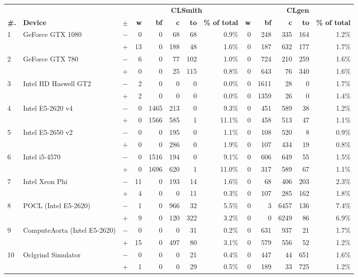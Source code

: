   \begin{tabular}{lll | rrrrr | rrrrr }
  \toprule
  & & & \multicolumn{5}{c|}{\textbf{CLSmith}} & \multicolumn{5}{c}{\textbf{CLgen}} \\
  \textbf{\#.} & \textbf{Device} & $\pm$ &
  \textbf{w} & \textbf{bf} & \textbf{c} & \textbf{to} & \textbf{\% of total} &
  \textbf{w} & \textbf{bf} & \textbf{c} & \textbf{to} & \textbf{\% of total} \\
  \midrule
  \multirow{ 2}{*}{1} & \multirow{ 2}{*}{GeForce GTX 1080} & $-$ & 0 & 0 & 68 & 68 & 0.9\%       & 0 & 248 & 335 & 164 & 1.2\% \\& & $+$ & 13 & 0 & 188 & 48 & 1.6\% & 0 & 187 & 632 & 177 & 1.7\% \\
\hline
\multirow{ 2}{*}{2} & \multirow{ 2}{*}{GeForce GTX 780} & $-$ & 6 & 0 & 77 & 102 & 1.0\%       & 0 & 724 & 210 & 259 & 1.6\% \\& & $+$ & 0 & 0 & 25 & 115 & 0.8\% & 0 & 643 & 76 & 340 & 1.6\% \\
\hline
\multirow{ 2}{*}{3} & \multirow{ 2}{*}{Intel HD Haswell GT2} & $-$ & 2 & 0 & 0 & 0 & 0.0\%       & 0 & 1611 & 28 & 0 & 1.7\% \\& & $+$ & 2 & 0 & 0 & 0 & 0.0\% & 0 & 1359 & 26 & 0 & 1.4\% \\
\hline
\multirow{ 2}{*}{4} & \multirow{ 2}{*}{Intel E5-2620 v4} & $-$ & 0 & 1465 & 213 & 0 & 9.3\%       & 0 & 451 & 589 & 38 & 1.2\% \\& & $+$ & 0 & 1566 & 585 & 1 & 11.1\% & 0 & 458 & 513 & 47 & 1.1\% \\
\hline
\multirow{ 2}{*}{5} & \multirow{ 2}{*}{Intel E5-2650 v2} & $-$ & 0 & 0 & 195 & 0 & 1.1\%       & 0 & 108 & 520 & 8 & 0.9\% \\& & $+$ & 0 & 0 & 286 & 0 & 1.9\% & 0 & 107 & 434 & 19 & 0.8\% \\
\hline
\multirow{ 2}{*}{6} & \multirow{ 2}{*}{Intel i5-4570} & $-$ & 0 & 1516 & 194 & 0 & 9.1\%       & 0 & 606 & 649 & 55 & 1.5\% \\& & $+$ & 0 & 1696 & 620 & 1 & 11.0\% & 0 & 317 & 589 & 67 & 1.1\% \\
\hline
\multirow{ 2}{*}{7} & \multirow{ 2}{*}{Intel Xeon Phi} & $-$ & 11 & 0 & 193 & 14 & 1.6\%       & 0 & 68 & 406 & 203 & 2.3\% \\& & $+$ & 4 & 0 & 0 & 11 & 0.3\% & 0 & 107 & 285 & 162 & 1.8\% \\
\hline
\multirow{ 2}{*}{8} & \multirow{ 2}{*}{POCL (Intel E5-2620)} & $-$ & 1 & 0 & 966 & 32 & 5.5\%       & 0 & 3 & 6457 & 136 & 7.4\% \\& & $+$ & 9 & 0 & 120 & 322 & 3.2\% & 0 & 0 & 6249 & 86 & 6.9\% \\
\hline
\multirow{ 2}{*}{9} & \multirow{ 2}{*}{ComputeAorta (Intel E5-2620)} & $-$ & 0 & 0 & 0 & 31 & 0.2\%       & 0 & 631 & 937 & 21 & 1.7\% \\& & $+$ & 15 & 0 & 497 & 80 & 3.1\% & 0 & 579 & 556 & 52 & 1.2\% \\
\hline
\multirow{ 2}{*}{10} & \multirow{ 2}{*}{Oclgrind Simulator} & $-$ & 0 & 0 & 0 & 21 & 0.4\%       & 0 & 447 & 44 & 651 & 1.6\% \\& & $+$ & 1 & 0 & 0 & 29 & 0.5\% & 0 & 189 & 33 & 725 & 1.2\% \\
  \bottomrule
\end{tabular}

